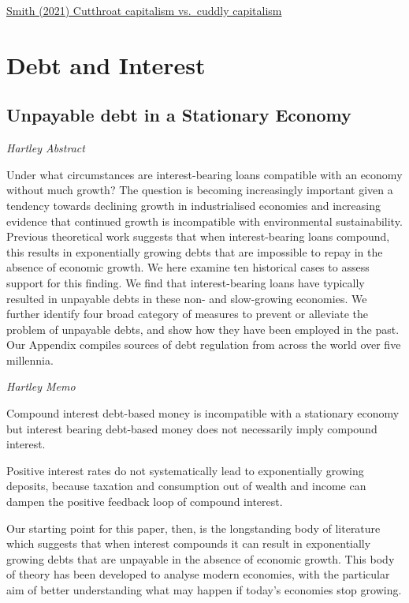 \documentclass[
]{book}
\begin{document}
\href{https://noahpinion.substack.com/p/cutthroat-capitalism-vs-cuddly-capitalism}{Smith (2021) Cutthroat capitalism vs.~cuddly capitalism}

\hypertarget{debt-and-interest}{%
\chapter{Debt and Interest}\label{debt-and-interest}}

\hypertarget{unpayable-debt-in-a-stationary-economy}{%
\section{Unpayable debt in a Stationary Economy}\label{unpayable-debt-in-a-stationary-economy}}

\emph{Hartley Abstract}

Under what circumstances are interest-bearing loans compatible with an economy without much growth? The question is becoming increasingly important given a tendency towards declining growth in industrialised economies and increasing evidence that continued growth is incompatible with environmental sustainability. Previous theoretical work suggests that when interest-bearing loans compound, this results in exponentially growing debts that are impossible to repay in the absence of economic growth. We here examine ten historical cases to assess support for this finding. We find that interest-bearing loans have typically resulted in unpayable debts in these non- and slow-growing economies. We further identify four broad category of measures to prevent or alleviate the problem of unpayable debts, and show how they have been employed in the past. Our Appendix compiles sources of debt regulation from across the world over five millennia.

\emph{Hartley Memo}

Compound interest debt-based money is incompatible with a
stationary economy but interest bearing debt-based money does not
necessarily imply compound interest.

Positive interest
rates do not systematically lead to exponentially growing deposits,
because taxation and consumption out of wealth and income can
dampen the positive feedback loop of compound interest.

Our starting point for this paper, then, is the longstanding body of
literature which suggests that when interest compounds it can result in
exponentially growing debts that are unpayable in the absence of
economic growth. This body of theory has been developed to analyse
modern economies, with the particular aim of better understanding
what may happen if today's economies stop growing.
\end{document}

